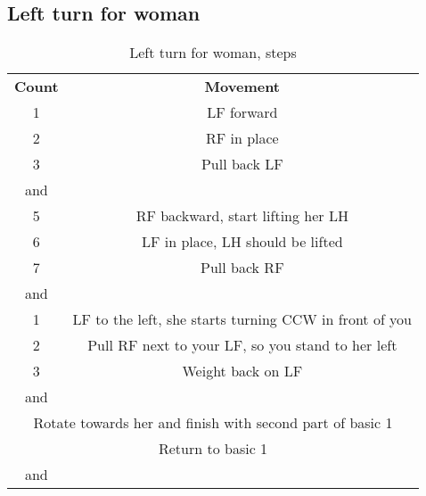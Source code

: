 \subsection{Left turn for woman}
\begin{table}[H]
\centering
\begin{tabular}{cc}
  \toprule
  \textbf{Count} & \textbf{Movement}\\
  \cmidrule(lr){1-1}\cmidrule(lr){2-2}
  1 & LF forward\\
  2 & RF in place\\
  3 & Pull back LF\\
  and &\\
  5 & RF backward, start lifting her LH\\
  6 & LF in place, LH should be lifted\\
  7 & Pull back RF\\
  and &\\
  1 & LF to the left, she starts turning CCW in front of you\\
  2 & Pull RF next to your LF, so you stand to her left\\
  3 & Weight back on LF\\
  and &\\
  \multicolumn{2}{c}{Rotate towards her and finish with second part of basic 1}\\
  \multicolumn{2}{c}{Return to basic 1}\\
  and &\\
  \bottomrule
\end{tabular}
\label{left_turn_for_woman_steps}
\caption{Left turn for woman, steps}
\end{table}

